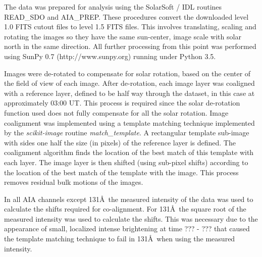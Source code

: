 \documentclass[onecolumn]{emulateapj}
\begin{document}
The data was prepared for analysis using the SolarSoft / IDL routines
READ\_SDO and AIA\_PREP.  These procedures convert the downloaded
level 1.0 FITS cutout files to level 1.5 FITS files.  This involves
translating, scaling and rotating the images so they have the same
sun-center, image scale with solar north in the same direction.  All
further processing from this point was performed using SunPy 0.7
(http://www.sunpy.org) running under Python 3.5.  

Images were
de-rotated to compensate for solar rotation, based on the center of
the field of view of each image.  After de-rotation, each image layer
was coaligned with a reference layer, defined to be half way through
the dataset, in this case at approximately 03:00 UT.  This process is
required since the solar de-rotation function used does not fully
compensate for all the solar rotation. Image coalignment was
implemented using a template matching technique \citep{lewis1995fast}
implemented by the {\it scikit-image} \citep{Vanderwalt2014} routine
{\it match\_template}.  A rectangular template sub-image with sides
one half the size (in pixels) of the reference layer is defined.  The
coalignment algorithm finds the location of the best match of this
template with each layer.  The image layer is then shifted (using
sub-pixel shifts) according to the location of the best match of the
template with the image.  This process removes residual bulk motions
of the images.

In all AIA channels except 131\AA\ the measured intensity of the data
was used to calculate the shifts required for co-alignment.  For
131\AA\ the square root of the measured intensity was used to
calculate the shifts.  This was necessary due to the appearance of
small, localized intense brightening at time ??? - ??? that caused the
template matching technique to fail in 131\AA\ when using the measured
intensity.

\end{document}
